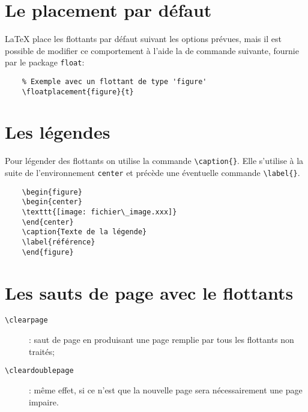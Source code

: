 \section{Le placement par défaut}
\LaTeX{} place les flottants par défaut suivant les options prévues, mais il est possible de modifier ce comportement à l'aide la de commande suivante, fournie par le package \texttt{float}:
\begin{verbatim}
    % Exemple avec un flottant de type 'figure'
    \floatplacement{figure}{t}
\end{verbatim}
\medskip

\section{Les légendes}
Pour légender des flottants on utilise la commande \verb|\caption{}|. Elle s'utilise à la suite de l'environnement \texttt{center} et précède une éventuelle commande \verb|\label{}|.
\begin{verbatim}
    \begin{figure}
    \begin{center}
    \texttt{[image: fichier\_image.xxx]}
    \end{center}
    \caption{Texte de la légende}
    \label{référence}
    \end{figure}
\end{verbatim}
\medskip

\section{Les sauts de page avec le flottants}
\begin{description}
	\item[\texttt{\textbackslash clearpage}]: saut de page en produisant une page  remplie par tous les flottants non traités;
	\item[\texttt{\textbackslash cleardoublepage}]: même effet, si ce n'est que la nouvelle page sera nécessairement une page impaire.
\end{description}
\medskip
